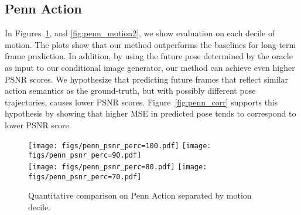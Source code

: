\documentclass{article}
\newcommand{\cutsubsectionup}{\vspace*{-0.09in}}
\newcommand{\cutsubsectiondown}{\vspace*{-0.04in}}
\newcommand{\cutsubsectionup}{}
\newcommand{\cutsubsectiondown}{}
\begin{document}
\begin{appendix}
\cutsubsectionup
\subsection{Penn Action}\label{supp:penn}
\cutsubsectiondown
In Figures~\ref{fig:penn_motion1}, and \ref{fig:penn_motion2}, we show evaluation on each decile of motion.
The plots show that our method outperforms the baselines for long-term frame prediction.
In addition, by using the future pose determined by the oracle as input to our conditional image generator, our method can achieve even higher PSNR scores.
We hypothesize that predicting future frames that reflect similar action semantics as the ground-truth, but with possibly different pose trajectories, causes lower PSNR scores.
Figure~\ref{fig:penn_corr} supports this hypothesis by showing that higher MSE in predicted pose tends to correspond to lower PSNR score.

\begin{figure}[htb!]
\centering
\vspace{30pt}
\texttt{[image: figs/penn\_psnr\_perc=100.pdf]}
\hspace{.8cm}
\texttt{[image: figs/penn\_psnr\_perc=90.pdf]} \\
\texttt{[image: figs/penn\_psnr\_perc=80.pdf]}
\hspace{.8cm}
\texttt{[image: figs/penn\_psnr\_perc=70.pdf]} \\
\caption{Quantitative comparison on Penn Action separated by motion decile.}
\label{fig:penn_motion1}
\vspace{-2cm}
\end{figure}


\end{appendix}
\end{document}
